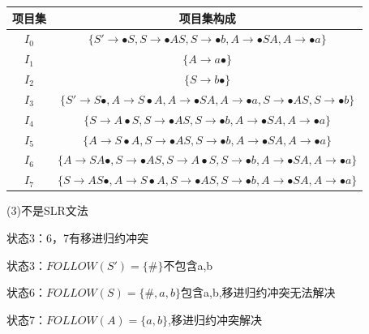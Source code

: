 \documentclass{article}
\begin{document}
\begin{center}
    \begin{longtable}{c|c}\hline
        项目集 & 项目集构成                                                                                                                                          \\\hline
        $I_0$  & $\{S'\rightarrow \bullet S,S\rightarrow \bullet AS,S\rightarrow \bullet b,A\rightarrow \bullet SA,A\rightarrow \bullet a\}$                         \\\hline
        $I_1$  & $\{A\rightarrow a\bullet \} $                                                                                                                       \\\hline
        $I_2$  & $\{S\rightarrow b\bullet\} $                                                                                                                        \\\hline
        $I_3$  & $\{S'\rightarrow S\bullet ,A\rightarrow S\bullet A,A\rightarrow \bullet SA,A\rightarrow \bullet a,S\rightarrow \bullet AS,S\rightarrow \bullet b\}$ \\\hline
        $I_4$  & $\{S\rightarrow A\bullet S,S\rightarrow \bullet AS,S\rightarrow \bullet b,A\rightarrow \bullet SA,A\rightarrow \bullet a\} $                        \\\hline
        $I_5$  & $\{A\rightarrow S\bullet A,S\rightarrow \bullet AS,S\rightarrow \bullet b,A\rightarrow \bullet SA,A\rightarrow \bullet a\} $                        \\\hline
        $I_6$  & $\{A\rightarrow SA\bullet ,S\rightarrow \bullet AS,S\rightarrow A\bullet S,S\rightarrow \bullet b,A\rightarrow \bullet SA,A\rightarrow \bullet a\}$ \\\hline
        $I_7$  & $\{S\rightarrow AS\bullet,A\rightarrow S\bullet A,S\rightarrow \bullet AS,S\rightarrow \bullet b,A\rightarrow \bullet SA,A\rightarrow \bullet a\} $ \\\hline
    \end{longtable}
\end{center}
\vspace{-1cm}


\noindent
(3)不是SLR文法

状态3：6，7有移进归约冲突

状态3：$FOLLOW(S')=\{\#\}$不包含a,b

状态6：$FOLLOW(S)=\{\#,a,b\}$包含a,b,移进归约冲突无法解决

状态7：$FOLLOW(A)=\{a,b\}$,移进归约冲突解决
\end{document}
